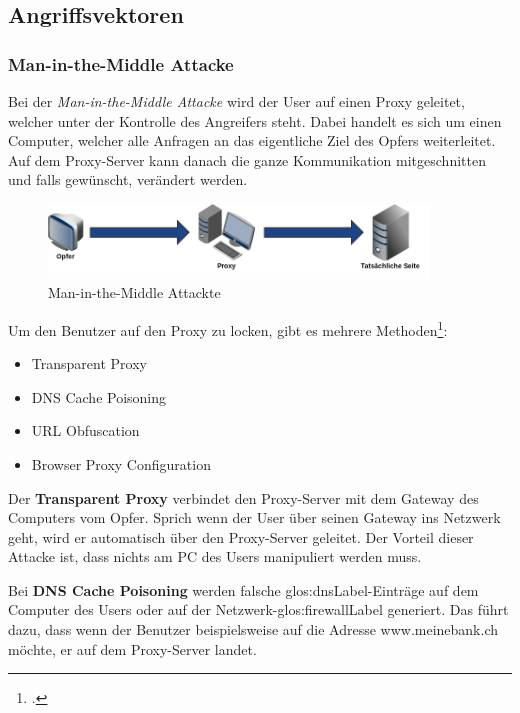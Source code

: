 \subsection{Angriffsvektoren}

\subsubsection{Man-in-the-Middle Attacke}
Bei der \textit{Man-in-the-Middle Attacke} wird der User auf einen Proxy geleitet, welcher unter der Kontrolle des Angreifers steht. Dabei handelt es sich um einen Computer, welcher alle Anfragen an das eigentliche Ziel des Opfers weiterleitet. Auf dem Proxy-Server kann danach die ganze Kommunikation mitgeschnitten und falls gewünscht, verändert werden.

\begin{figure}[H]
  \centering
  \includegraphics[width=0.9\textwidth]{images/man-in-the-middle-attacke.png}
  \caption{Man-in-the-Middle Attackte}
  \label{fig:phishing:angriffvorbereiten:attacken:maninthemiddleattacke}
\end{figure}

Um den Benutzer auf den Proxy zu locken, gibt es mehrere Methoden\footcite{NISR-WP-Phishingv101doc_2015-06-29}:
\begin{itemize}
\item Transparent Proxy
\item DNS Cache Poisoning
\item URL Obfuscation
\item Browser Proxy Configuration
\end{itemize}

Der \textbf{Transparent Proxy} verbindet den Proxy-Server mit dem Gateway des Computers vom Opfer. Sprich wenn der User über seinen Gateway ins Netzwerk geht, wird er automatisch über den Proxy-Server geleitet. Der Vorteil dieser Attacke ist, dass nichts am PC des Users manipuliert werden muss.

Bei \textbf{DNS Cache Poisoning} werden falsche \gls{glos:dnsLabel}-Einträge auf dem Computer des Users oder auf der Netzwerk-\gls{glos:firewallLabel} generiert. Das führt dazu, dass wenn der Benutzer beispielsweise auf die Adresse www.meinebank.ch möchte, er auf dem Proxy-Server landet.

